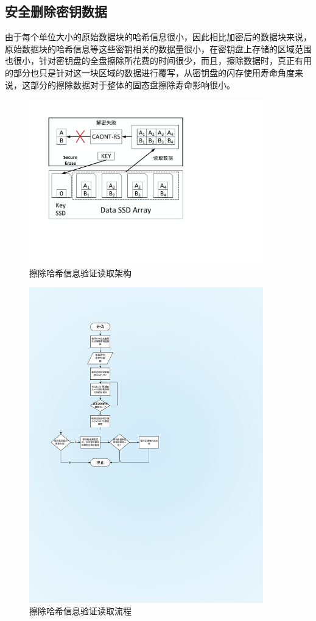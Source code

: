 \subsection{安全删除密钥数据}
由于每个单位大小的原始数据块的哈希信息很小，因此相比加密后的数据块来说，原始数据块的哈希信息等这些密钥相关的数据量很小，在密钥盘上存储的区域范围也很小，针对密钥盘的全盘擦除所花费的时间很少，而且，擦除数据时，真正有用的部分也只是针对这一块区域的数据进行覆写，从密钥盘的闪存使用寿命角度来说，这部分的擦除数据对于整体的固态盘擦除寿命影响很小。
\begin{figure}[H]
	\centering
	\includegraphics[width=4in]{Pics/del-key-st.pdf}
	\caption{擦除哈希信息验证读取架构}\label{fig:13}
\end{figure}
\begin{figure}[H]
	\centering
	\includegraphics[width=4in]{Pics/del-key-pr.pdf}
	\caption{擦除哈希信息验证读取流程}\label{fig:14}
\end{figure}
